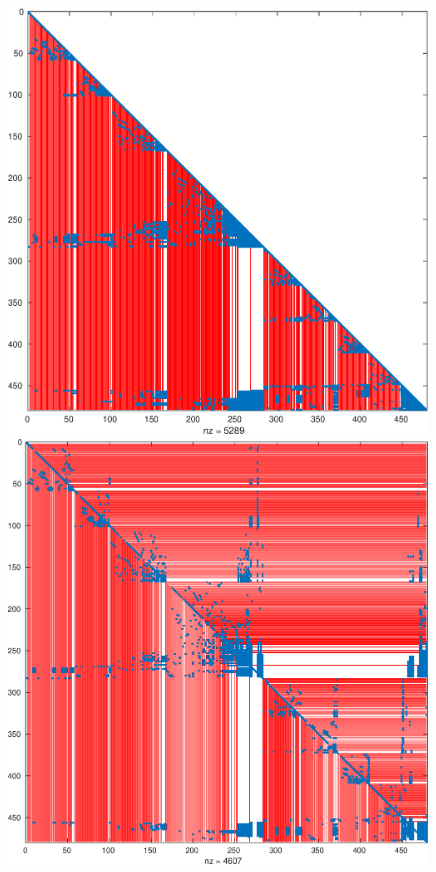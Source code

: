 \begin{figure}
 \centering
\begin{minipage}{.72\textwidth}
 \begin{center}
\includegraphics[width=0.99\textwidth]{figures/west0479-match-metis-chol-super} 
 \end{center}
\end{minipage}
\par \bigskip
\begin{minipage}{.72\textwidth}
  \begin{center}
\includegraphics[width=0.99\textwidth]{figures/west0479-match-metis-lu-super} 

\end{center}
\end{minipage}
\end{figure}
